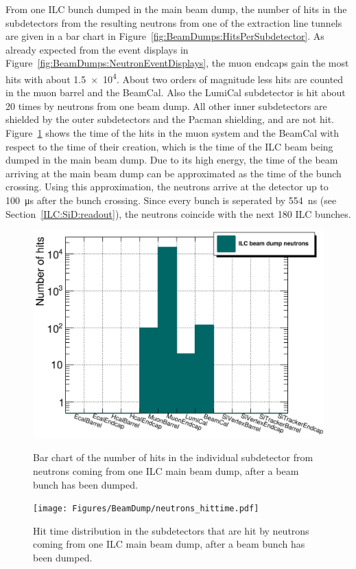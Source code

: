 From one ILC bunch dumped in the main beam dump, the number of hits in the \sid subdetectors from the resulting neutrons from one of the extraction line tunnels are given in a bar chart in Figure~\ref{fig:BeamDumps:HitsPerSubdetector}.
As already expected from the event displays in Figure~\ref{fig:BeamDumps:NeutronEventDisplays}, the \sid muon endcaps gain the most hits with about \num{1.5e4}.
About two orders of magnitude less hits are counted in the muon barrel and the BeamCal.
Also the LumiCal subdetector is hit about \num{20} times by neutrons from one beam dump.
All other inner \sid subdetectors are shielded by the outer subdetectors and the Pacman shielding, and are not hit.
\\Figure~\ref{fig:BeamDumps:HitTime} shows the time of the hits in the \sid muon system and the BeamCal with respect to the time of their creation, which is the time of the ILC beam being dumped in the main beam dump.
Due to its high energy, the time of the beam arriving at the main beam dump can be approximated as the time of the bunch crossing.
Using this approximation, the neutrons arrive at the \sid detector up to \SI{100}{\micro\second} after the bunch crossing.
Since every bunch is seperated by \SI{554}{\nano\second} (see Section~\ref{ILC:SiD:readout}), the neutrons coincide with the next 180 ILC bunches.
\begin{figure}[hbp]
\centering
\begin{minipage}[t]{0.49\textwidth}
\centering
 \includegraphics[width=\textwidth]{Figures/BeamDump/Hits_in_SiD_subdetectors.png}
\caption[Number of hits in the \sid subdetectors of the ILC main beam dump neutrons]{Bar chart of the number of hits in the individual \sid subdetector from neutrons coming from one ILC main beam dump, after a beam bunch has been dumped.}
\label{fig:BeamDumps:HitsPerSubdetector}
\end{minipage}
\hfill
\begin{minipage}[t]{0.49\textwidth}
\centering
 \texttt{[image: Figures/BeamDump/neutrons\_hittime.pdf]}
\caption[Neutron hit time in the \sid subdetectors]{Hit time distribution in the \sid subdetectors that are hit by neutrons coming from one ILC main beam dump, after a beam bunch has been dumped.}
\label{fig:BeamDumps:HitTime}
\end{minipage}
\end{figure}
